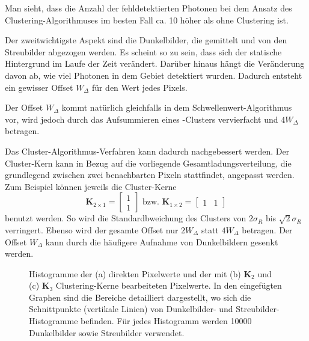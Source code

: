 \noindent
Man sieht, dass die Anzahl der fehldetektierten Photonen bei dem Ansatz des Clustering-Al\-go\-rith\-muses im besten Fall ca. 10 höher als ohne Clustering ist. 

\noindent
Der zweitwichtigste Aspekt sind die Dunkelbilder, die gemittelt und von den Streubilder abgezogen werden. Es scheint so zu sein, dass sich der statische Hintergrund im Laufe der Zeit verändert. Darüber hinaus hängt die Veränderung davon ab, wie viel Photonen in dem Gebiet detektiert wurden. Dadurch entsteht ein gewisser Offset $W_\Delta$ für den Wert jedes Pixels.

\noindent
Der Offset $W_\Delta$ kommt natürlich gleichfalls in dem Schwellenwert-Algorithmus vor, wird jedoch durch das Aufsummieren eines -Clusters vervierfacht und $4W_\Delta$ betragen.

\noindent
Das Cluster-Algorithmus-Verfahren kann dadurch nachgebessert werden. Der Cluster-Kern kann in Bezug auf die vorliegende Gesamtladungsverteilung, die grundlegend zwischen zwei benachbarten Pixeln stattfindet, angepasst werden. Zum Beispiel können jeweils die Cluster-Kerne
\begin{equation}
    \mathbf{K}_{2\times1} = \begin{bmatrix}
1\\
1
\end{bmatrix}
\text{ bzw. }
    \mathbf{K}_{1\times2} = \begin{bmatrix}
1 & 1
\end{bmatrix}
\end{equation}
benutzt werden. So wird die Standardbweichung des Clusters von $2\sigma_R$ bis $\sqrt{2}\sigma_R$ verringert. Ebenso wird der gesamte Offset nur $2W_\Delta$ statt $4W_\Delta$ betragen. Der Offset $W_\Delta$ kann durch die häufigere Aufnahme von Dunkelbildern gesenkt werden.
\begin{figure}[H]
    \centering
    
    \caption{Histogramme der (a) direkten Pixelwerte und der mit (b) $\mathbf{K}_2$ und (c) $\mathbf{K}_3$ Clustering-Kerne bearbeiteten Pixelwerte. In den eingefügten Graphen sind die Bereiche detailliert dargestellt, wo sich die Schnittpunkte (vertikale Linien) von Dunkelbilder- und Streubilder-Histogramme befinden. Für jedes Histogramm werden \num{10000} Dunkelbilder sowie Streubilder verwendet.}
    \label{fig:no_pr_cl_2_cl_3_histograms}
\end{figure}